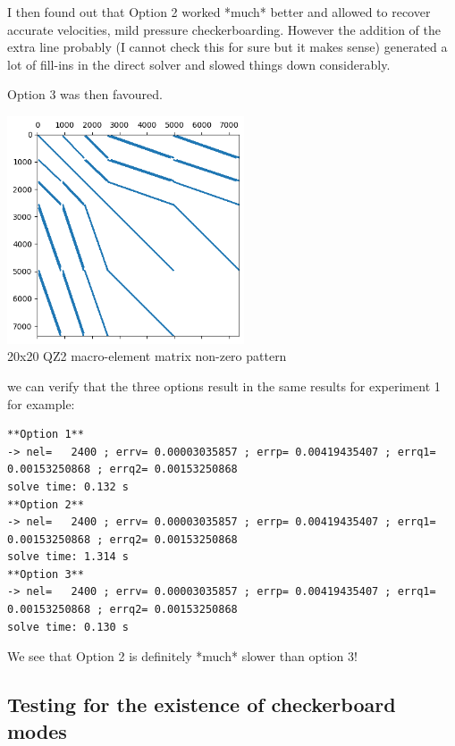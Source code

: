 I then found out that Option 2 worked *much* better
and allowed to recover accurate velocities, mild pressure checkerboarding.
However the addition of the extra line probably (I cannot check this 
for sure but it makes sense)  generated a lot of fill-ins in the direct solver
and slowed things down considerably.

Option 3 was then favoured.

\begin{center}
\includegraphics[width=7cm]{./images/lagrange/A_bef.png}\\
{\captionfont 20x20 QZ2 macro-element matrix non-zero pattern}
\end{center}


we can verify that the three options result in the same results 
for experiment 1 for example:

\begin{verbatim}
**Option 1**
-> nel=   2400 ; errv= 0.00003035857 ; errp= 0.00419435407 ; errq1= 0.00153250868 ; errq2= 0.00153250868
solve time: 0.132 s
**Option 2**
-> nel=   2400 ; errv= 0.00003035857 ; errp= 0.00419435407 ; errq1= 0.00153250868 ; errq2= 0.00153250868
solve time: 1.314 s
**Option 3**
-> nel=   2400 ; errv= 0.00003035857 ; errp= 0.00419435407 ; errq1= 0.00153250868 ; errq2= 0.00153250868
solve time: 0.130 s
\end{verbatim}

We see that Option 2 is definitely *much* slower than option 3!






\newpage
\subsection*{Testing for the existence of checkerboard modes}



